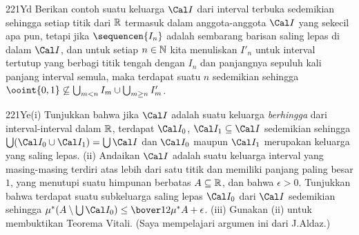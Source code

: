 {\spheader 221Yd Berikan contoh suatu keluarga $\Cal I$ dari interval
terbuka sedemikian sehingga setiap titik dari $\Bbb R$ termasuk dalam
anggota-anggota $\Cal I$ yang sekecil apa pun, tetapi jika
$\sequencen{I_n}$ adalah sembarang barisan saling lepas di dalam $\Cal I$,
dan untuk setiap $n\in\Bbb N$ kita menuliskan $I'_n$ untuk interval
tertutup yang berbagi titik tengah dengan $I_n$ dan panjangnya sepuluh kali
panjang interval semula, maka terdapat suatu $n$ sedemikian sehingga
$\ooint{0,1}\not\subseteq\bigcup_{m<n}I_m\cup\bigcup_{m\ge n}I'_m$.

\spheader 221Ye(i) Tunjukkan bahwa jika $\Cal I$ adalah suatu keluarga
{\it berhingga} dari interval-interval dalam $\Bbb R$, terdapat
$\Cal I_0$, $\Cal I_1\subseteq\Cal I$ sedemikian sehingga
$\bigcup(\Cal I_0\cup\Cal I_1)=\bigcup\Cal I$ dan $\Cal I_0$ maupun
$\Cal I_1$ merupakan keluarga yang saling lepas.  (ii) Andaikan $\Cal I$ adalah suatu keluarga interval
yang masing-masing terdiri atas lebih dari satu titik dan memiliki panjang
paling besar $1$, yang menutupi suatu himpunan berbatas
$A\subseteq\Bbb R$, dan bahwa $\epsilon>0$. Tunjukkan bahwa
terdapat suatu subkeluarga saling lepas $\Cal I_0$ dari $\Cal I$ sedemikian
sehingga
$\mu^*(A\setminus\bigcup\Cal I_0)\le\bover12\mu^*A+\epsilon$.
(iii) Gunakan (ii) untuk membuktikan Teorema Vitali. (Saya mempelajari
argumen ini dari J.Aldaz.)
}%

